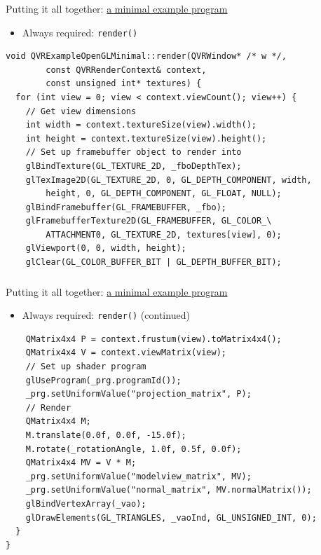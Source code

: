 \documentclass[utf8,stillsansserifmath,fleqn,t]{beamer}
\newcommand{\code}[1]{\texttt{#1}}
\begin{document}
\begin{frame}[fragile]
\frametitle{\insertsection}
Putting it all together:
\href{https://git.marlam.de/gitweb/?p=qvr.git;a=tree;hb=HEAD;f=qvr-example-opengl-minimal}{a minimal example program}
\begin{itemize}
    \item Always required: \code{render()}
\end{itemize}
{\small
\begin{lstlisting}
void QVRExampleOpenGLMinimal::render(QVRWindow* /* w */,
        const QVRRenderContext& context,
        const unsigned int* textures) {
  for (int view = 0; view < context.viewCount(); view++) {
    // Get view dimensions
    int width = context.textureSize(view).width();
    int height = context.textureSize(view).height();
    // Set up framebuffer object to render into
    glBindTexture(GL_TEXTURE_2D, _fboDepthTex);
    glTexImage2D(GL_TEXTURE_2D, 0, GL_DEPTH_COMPONENT, width,
        height, 0, GL_DEPTH_COMPONENT, GL_FLOAT, NULL);
    glBindFramebuffer(GL_FRAMEBUFFER, _fbo);
    glFramebufferTexture2D(GL_FRAMEBUFFER, GL_COLOR_\
        ATTACHMENT0, GL_TEXTURE_2D, textures[view], 0);
    glViewport(0, 0, width, height);
    glClear(GL_COLOR_BUFFER_BIT | GL_DEPTH_BUFFER_BIT);
\end{lstlisting}
}
\end{frame}
\begin{frame}[fragile]
\frametitle{\insertsection}
Putting it all together:
\href{https://git.marlam.de/gitweb/?p=qvr.git;a=tree;hb=HEAD;f=qvr-example-opengl-minimal}{a minimal example program}
\begin{itemize}
    \item Always required: \code{render()} (continued)
\end{itemize}
{\small
\begin{lstlisting}
    QMatrix4x4 P = context.frustum(view).toMatrix4x4();
    QMatrix4x4 V = context.viewMatrix(view);
    // Set up shader program
    glUseProgram(_prg.programId());
    _prg.setUniformValue("projection_matrix", P);
    // Render
    QMatrix4x4 M;
    M.translate(0.0f, 0.0f, -15.0f);
    M.rotate(_rotationAngle, 1.0f, 0.5f, 0.0f);
    QMatrix4x4 MV = V * M;
    _prg.setUniformValue("modelview_matrix", MV);
    _prg.setUniformValue("normal_matrix", MV.normalMatrix());
    glBindVertexArray(_vao);
    glDrawElements(GL_TRIANGLES, _vaoInd, GL_UNSIGNED_INT, 0);
  }
}
\end{lstlisting}
}
\end{frame}
\end{document}

